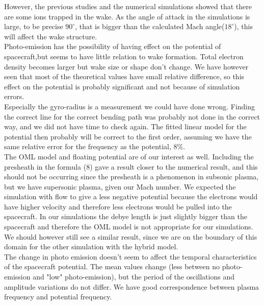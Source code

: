 \documentclass[aip, 
rsi, 
amsmath,
amssymb,
longbibliography,
preprint]{revtex4-1}
\begin{document}
However, the previous studies \cite{P1} and the numerical simulations showed that there are some ions trapped in the wake. As the angle of attack in the simulations is large, to be precise $90^{\circ}$, that is bigger than the calculated Mach angle($18^{\circ}$), this will affect the wake structure.\\

Photo-emission has the possibility of having effect on the potential of spacecraft,but seems to have little relation to wake formation. Total electron density becomes larger but wake size or shape don't change. We have however seen that most of the theoretical values have small relative difference, so this effect on the potential is probably significant and not because of simulation errors.\\

Especially the gyro-radius is a measurement we could have done wrong. Finding the correct line for the correct bending path was probably not done in the correct way, and we did not have time to check again. The fitted linear model for the potential then probably will be correct to the first order, assuming we have the same relative error for the frequency as the potential, $8\%$.\\

The OML model and floating potential are of our interest as well. Including the presheath in the formula (8) gave a result closer to the numerical result, and this should not be occurring since the presheath is a phenomenon in subsonic plasma, but we have supersonic plasma, given our Mach number. We expected the simulation with flow to give a less negative potential because the electrons would have higher velocity and therefore less electrons would be pulled into the spacecraft. In our simulations the debye length is just slightly bigger than the spacecraft and therefore the OML model is not appropriate for our simulations. We should however still see a similar result, since we are on the boundary of this domain for the other simulation with the hybrid model\cite{P7}.\\

The change in photo emission doesn't seem to affect the temporal characteristics of the spacecraft potential. The mean values change (less between no photo-emission and "low" photo-emission), but the period of the oscillations and amplitude variations do not differ. We have good correspondence between plasma frequency and potential frequency.\\
\end{document}
